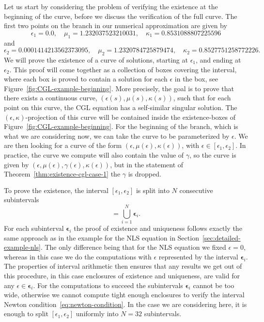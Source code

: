 \documentclass[11pt]{article}
\newcommand{\inter}[1]{\bm{#1}}
\begin{document}
Let us start by considering the problem of verifying the existence at
the beginning of the curve, before we discuss the verification of the
full curve. The first two points on the branch in our numerical
approximation are given by
\begin{equation*}
  \epsilon_1 = 0.0,\quad
  \mu_1 = 1.232037523210031,\quad
  \kappa_1 = 0.8531088807225596
\end{equation*}
and
\begin{equation*}
  \epsilon_2 = 0.0001414213562373095,\quad
  \mu_2 = 1.2320784725879474,\quad
  \kappa_2 = 0.8527751258772226.
\end{equation*}
We will prove the existence of a curve of solutions, starting at
\(\epsilon_1\), and ending at \(\epsilon_2\). This proof will come
together as a collection of boxes covering the interval, where each
box is proved to contain a solution for each \(\epsilon\) in the box,
see Figure~\ref{fig:CGL-example-beginning}. More precisely, the goal
is to prove that there exists a continuous curve,
\((\epsilon(s), \mu(s), \kappa(s))\), such that for each point on this
curve, the CGL equation has a self-similar singular solution. The
\((\epsilon, \kappa)\)-projection of this curve will be contained
inside the existence-boxes of Figure~\ref{fig:CGL-example-beginning}.
For the beginning of the branch, which is what we are considering now,
we can take the curve to be parameterized by \(\epsilon\). We are then
looking for a curve of the form
\((\epsilon, \mu(\epsilon), \kappa(\epsilon))\), with
\(\epsilon \in [\epsilon_1, \epsilon_2]\). In practice, the curve we
compute will also contain the value of \(\gamma\), so the curve is
given by
\((\epsilon, \mu(\epsilon), \gamma(\epsilon), \kappa(\epsilon))\), but
in the statement of Theorem~\ref{thm:existence-cgl-case-1} the
\(\gamma\) is dropped.

To prove the existence, the interval \([\epsilon_{1}, \epsilon_{2}]\)
is split into \(N\) consecutive subintervals
\begin{equation*}
  [\epsilon_1, \epsilon_2] = \bigcup_{i = 1}^{N} \inter{\epsilon}_{i}.
\end{equation*}
For each subinterval \(\inter{\epsilon}_{i}\) the proof of existence
and uniqueness follows exactly the same approach as in the example for
the NLS equation in Section~\ref{sec:detailed-example-nls}. The only
difference being that for the NLS equation we fixed \(\epsilon = 0\),
whereas in this case we do the computations with \(\epsilon\)
represented by the interval \(\inter{\epsilon}_i\). The properties of
interval arithmetic then ensures that any results we get out of
this procedure, in this case enclosures of existence and uniqueness,
are valid for any \(\epsilon \in \inter{\epsilon}_i\). For the
computations to succeed the subintervals \(\inter{\epsilon}_{i}\)
cannot be too wide, otherwise we cannot compute tight enough
enclosures to verify the interval Newton
condition~\eqref{eq:newton-condition}. In the case we are considering
here, it is enough to split \([\epsilon_{1}, \epsilon_{2}]\) uniformly
into \(N = 32\) subintervals.
\end{document}
